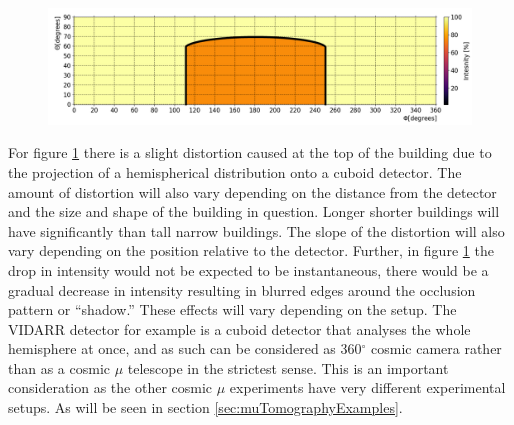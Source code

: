  \begin{figure}[!h]
 \centering
 \includegraphics[width=\linewidth]{Chapter5/Figs/wylfaRasterNew/phiVsThetaExpectedInferno_outlined.png}
 \label{fig:thetaVsPhiExpectedCube}
\end{figure}

For figure \ref{fig:thetaVsPhiExpectedCube} there is a slight distortion caused at the top of the building due to the projection of a hemispherical distribution onto a cuboid detector. The amount of distortion will also vary depending on the distance from the detector and the size and shape of the building in question. Longer shorter buildings will have significantly than tall narrow buildings. The slope of the distortion will also vary depending on the position relative to the detector. Further, in figure \ref{fig:thetaVsPhiExpectedCube} the drop in intensity would not be expected to be instantaneous, there would be a gradual decrease in intensity resulting in blurred edges around the occlusion pattern or ``shadow.'' These effects will vary depending on the setup. The VIDARR detector for example is a cuboid detector that analyses the whole hemisphere at once, and as such can be considered as 360$^\circ$ cosmic camera rather than as a cosmic $\mu$ telescope in the strictest sense. This is an important consideration as the other cosmic $\mu$ experiments have very different experimental setups. As will be seen in section \ref{sec:muTomographyExamples}.


